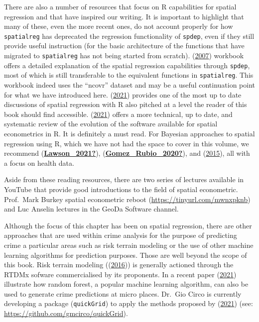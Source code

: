 \documentclass[
  krantz2]{krantz}
\begin{document}
There are also a number of resources that focus on R capabilities for spatial regression and that have inspired our writing. It is important to highlight that many of these, even the more recent ones, do not account properly for how \texttt{spatialreg} has deprecated the regression functionality of \texttt{spdep}, even if they still provide useful instruction (for the basic architecture of the functions that have migrated to \texttt{spatialreg} has not being started from scratch). (\protect\hyperlink{ref-Anselin_2007}{2007}) workbook offers a detailed explanation of the spatial regression capabilities through \texttt{spdep}, most of which is still transferable to the equivalent functions in \texttt{spatialreg}. This workbook indeed uses the ``ncovr'' dataset and may be a useful continuation point for what we have introduced here. (\protect\hyperlink{ref-Kopczewska_2021}{2021}) provides one of the most up to date discussions of spatial regression with R also pitched at a level the reader of this book should find accessible. (\protect\hyperlink{ref-Bivand_2021}{2021}) offers a more technical, up to date, and systematic review of the evolution of the software available for spatial econometrics in R. It is definitely a must read. For Bayesian approaches to spatial regression using R, which we have not had the space to cover in this volume, we recommend (\protect\hyperlink{ref-Lawson_2021}{\textbf{Lawson\_2021?}}), (\protect\hyperlink{ref-Gomez_Rubio_2020}{\textbf{Gomez\_Rubio\_2020?}}), and (\protect\hyperlink{ref-Blangiardo_2015}{2015}), all with a focus on health data.

Aside from these reading resources, there are two series of lectures available in YouTube that provide good introductions to the field of spatial econometric. Prof.~Mark Burkey spatial econometric reboot (\url{https://tinyurl.com/mwnxpknb}) and Luc Anselin lectures in the GeoDa Software channel.

Although the focus of this chapter has been on spatial regression, there are other approaches that are used within crime analysis for the purpose of predicting crime a particular areas such as risk terrain modeling or the use of other machine learning algorithms for prediction purposes. Those are well beyond the scope of this book. Risk terrain modeling ((\protect\hyperlink{ref-Caplan_2016}{2016})) is generally actioned through the RTDMx sofware commercialised by its proponents. In a recent paper (\protect\hyperlink{ref-Wheeler_2021}{2021}) illustrate how random forest, a popular machine learning algorithm, can also be used to generate crime predictions at micro places. Dr.~Gio Circo is currently developing a package (\texttt{quickGrid}) to apply the methods proposed by (\protect\hyperlink{ref-Wheeler_2021}{2021}) (see: \url{https://github.com/gmcirco/quickGrid}).
\end{document}
